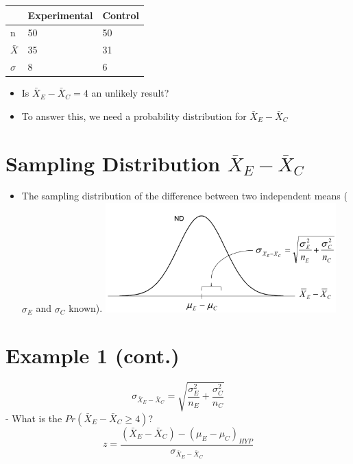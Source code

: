 \documentclass[12pt]{article}
\begin{document}
\begin{longtable}[c]{@{}lll@{}}
\toprule
& Experimental & Control\tabularnewline
\midrule
\endhead
n & 50 & 50\tabularnewline
\(\bar{X}\) & 35 & 31\tabularnewline
\(\sigma\) & 8 & 6\tabularnewline
\bottomrule
\end{longtable}

\begin{itemize}
\itemsep1pt\parskip0pt
\item
  Is \(\bar{X}_{E} - \bar{X}_{C} = 4\) an unlikely result?
\item
  To answer this, we need a probability distribution for
  \(\bar{X}_{E} - \bar{X}_{C}\)
\end{itemize}

\section{\texorpdfstring{Sampling Distribution
\(\bar{X}_{E} - \bar{X}_{C}\)}{Sampling Distribution \textbackslash{}bar\{X\}\_\{E\} - \textbackslash{}bar\{X\}\_\{C\}}}\label{sampling-distribution-barxux5fe---barxux5fc}

\begin{itemize}
\itemsep1pt\parskip0pt
\item
  The sampling distribution of the difference between two independent
  means (\(\sigma_{E}\) and \(\sigma_{C}\) known).
  \includegraphics[width=3.5in]{samp_dist_2samp.png}
\end{itemize}

\section{Example 1 (cont.)}\label{example-1-cont.-1}

\[ \sigma_{\bar{X}_{E} - \bar{X}_{C}} = \sqrt{\frac{\sigma_{E}^{2}}{n_{E}} + \frac{\sigma_{C}^{2}}{n_{C}}} \]
- What is the \(Pr(\bar{X}_{E} - \bar{X}_{C} \geq 4)\)?
\[ z = \frac{(\bar{X}_{E} - \bar{X}_{C}) - (\mu_{E} - \mu_{C})_{HYP}}{\sigma_{\bar{X}_{E} - \bar{X}_{C}}} \]
\end{document}
